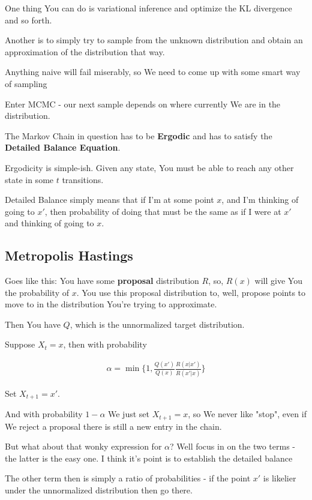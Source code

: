 \documentclass{article}
\begin{document}
	One thing You can do is variational inference and optimize the KL divergence and so forth.
	
	Another is to simply try to sample from the unknown distribution and obtain an approximation of the distribution that way. 
	
	Anything naive will fail miserably, so We need to come up with some smart way of sampling
	
	Enter MCMC - our next sample depends on where currently We are in the distribution. 
	
	The Markov Chain in question has to be \textbf{Ergodic} and has to satisfy the \textbf{Detailed Balance Equation}.
	
	Ergodicity is simple-ish. Given any state, You must be able to reach any other state in some $t$ transitions. 
	
	Detailed Balance simply means that if I'm at some point $x$, and I'm thinking of going to $x'$, then probability of doing that must be the same as if I were at $x'$ and thinking of going to $x$.
	
	
	\subsection{Metropolis Hastings}
	
		Goes like this: You have some \textbf{proposal} distribution $R$, so, $R(x)$ will give You the probability of $x$. You use this proposal distribution to, well, propose points to move to in the distribution You're trying to approximate.
		
		Then You have $Q$, which is the unnormalized target distribution.
		
		Suppose $X_t = x$, then with probability 
		
		\begin{align}
			\alpha = \min\bigg\{1, \frac{Q(x')}{Q(x)}\frac{R(x|x')}{R(x'|x)}\bigg\}
		\end{align}
		
		Set $X_{t+1} = x'$.
		
		And with probability $1-\alpha$ We just set $X_{t+1} = x$, so We never like "stop", even if We reject a proposal there is still a new entry in the chain.
		
		But what about that wonky expression for $\alpha$? Well focus in on the two terms - the latter is the easy one. I think it's point is to establish the detailed balance
		
		The other term then is simply a ratio of probabilities - if the point $x'$ is likelier under the unnormalized distribution then go there.
		
\end{document}
